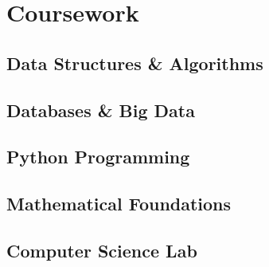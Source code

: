 \documentclass[]{resume}
\begin{document}
\begin{minipage}[t]{0.34\textwidth}
\section{Coursework}
\subsection{Data Structures \& Algorithms}
\vspace{1em}
\subsection{Databases \& Big Data} 
\vspace{1em}
\subsection{Python Programming} 
\vspace{1em}
\subsection{Mathematical Foundations} 
\vspace{1em}
\subsection{Computer Science Lab} 
\sectionsep
\end{minipage} 
\hfill
\end{document}
